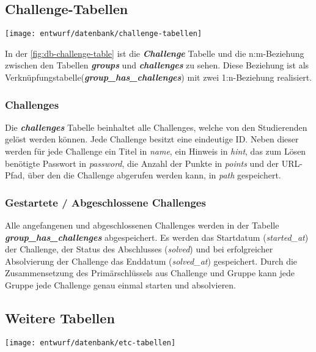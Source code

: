 \clearpage
\subsection{Challenge-Tabellen}
\begin{center}
	\texttt{[image: entwurf/datenbank/challenge-tabellen]}
	\label{fig:db-challenge-table}
\end{center}
In der \autoref{fig:db-challenge-table} ist die \textbf{\textit{Challenge}} Tabelle und die n:m-Beziehung zwischen den Tabellen \textbf{\textit{groups}} und \textbf{\textit{challenges}} zu sehen. Diese Beziehung ist als Verknüpfungstabelle\linebreak (\textbf{\textit{group\_has\_challenges}}) mit zwei 1:n-Beziehung realisiert.

\subsubsection{Challenges}
Die \textbf{\textit{challenges}} Tabelle beinhaltet alle Challenges, welche von den Studierenden gelöst werden können. Jede Challenge besitzt eine eindeutige ID. Neben dieser werden für jede Challenge ein Titel in \textit{name}, ein Hinweis in \textit{hint}, das zum Lösen benötigte Passwort in \textit{password}, die Anzahl der Punkte in \textit{points} und der URL-Pfad, über den die Challenge abgerufen werden kann, in \textit{path} gespeichert.

\subsubsection{Gestartete / Abgeschlossene Challenges}
Alle angefangenen und abgeschlossenen Challenges werden in der Tabelle \linebreak
\textbf{\textit{group\_has\_challenges}} abgespeichert. Es werden das Startdatum (\textit{started\_at}) der Challenge, der Status des Abschlusses (\textit{solved}) und bei erfolgreicher Absolvierung der Challenge das Enddatum (\textit{solved\_at}) gespeichert. Durch die Zusammensetzung des Primärschlüssels aus Challenge und Gruppe kann jede Gruppe jede Challenge genau einmal starten und absolvieren.

\subsection{Weitere Tabellen}
\begin{center}
	\texttt{[image: entwurf/datenbank/etc-tabellen]}
	\label{fig:db-etc-table}
\end{center}

